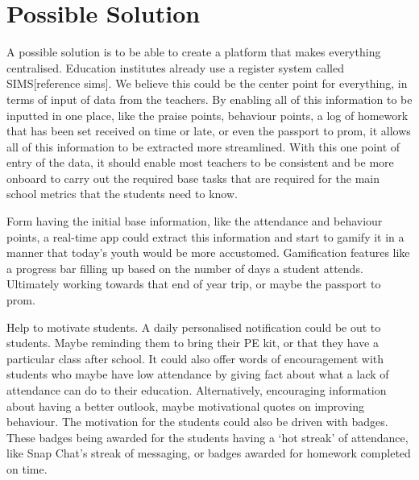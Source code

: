 \documentclass{sigchi}
\begin{document}
\section{Possible Solution}

A possible solution is to be able to create a platform that makes everything centralised. Education institutes already use a register system called SIMS[reference sims]. We believe this could be the center point for everything, in terms of input of data from the teachers. By enabling all of this information to be inputted in one place, like the praise points, behaviour points, a log of homework that has been set received on time or late, or even the passport to prom, it allows all of this information to be extracted more streamlined. With this one point of entry of the data, it should enable most teachers to be consistent and be more onboard to carry out the required base tasks that are required for the main school metrics that the students need to know.

Form having the initial base information, like the attendance and behaviour points, a real-time app could extract this information and start to gamify it in a manner that today’s youth would be more accustomed. Gamification features like a progress bar filling up based on the number of days a student attends. Ultimately working towards that end of year trip, or maybe the passport to prom.

Help to motivate students. A daily personalised notification could be out to students. Maybe reminding them to bring their PE kit, or that they have a particular class after school. It could also offer words of encouragement with students who maybe have low attendance by giving fact about what a lack of attendance can do to their education. Alternatively, encouraging information about having a better outlook, maybe motivational quotes on improving behaviour. The motivation for the students could also be driven with badges. These badges being awarded for the students having a ‘hot streak’ of attendance, like Snap Chat’s streak of messaging, or badges awarded for homework completed on time.
\end{document}
